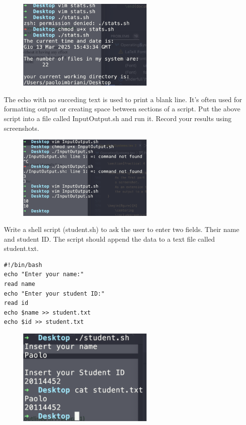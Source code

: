 \documentclass[a4paper]{article}
\begin{document}
\begin{figure}[H]
\centering
\includegraphics[width=0.6\textwidth]{pract4ex3.png}
\end{figure}
\noindent
The echo with no succeding text is used to print a blank line. It's often used for formatting output or creating space between sections of a script.
\textcolor{green!50!black}{
    Put the above script into a file called InputOutput.sh and run it. Record your results using screenshots.
}
\begin{figure}[H]
\centering
\includegraphics[width=0.6\textwidth]{pract4ex4.png}
\end{figure}

\textcolor{green!50!black}{
    Write a shell script (student.sh) to ask the user to enter two fields. Their name and student ID. The script should
    append the data to a text file called student.txt.
}

\begin{verbatim}
#!/bin/bash
echo "Enter your name:"
read name
echo "Enter your student ID:"
read id
echo $name >> student.txt
echo $id >> student.txt
\end{verbatim}

\begin{figure}[H]
\centering
\includegraphics[width=0.6\textwidth]{pract4ex5.png}
\end{figure}
\end{document}
